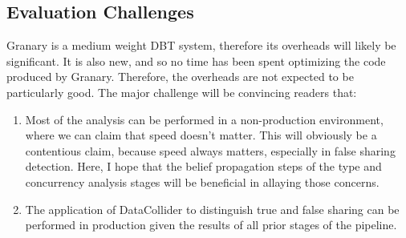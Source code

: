 \documentclass{sig-alternate}
\begin{document}
\subsection{Evaluation Challenges}
Granary is a medium weight DBT system, therefore its overheads will likely be significant. It is also new, and so no time has been
spent optimizing the code produced by Granary. Therefore, the overheads are not expected to be particularly good. The major
challenge will be convincing readers that:
\begin{enumerate}
\item Most of the analysis can be performed in a non-production environment, where we can claim that speed doesn't matter.
This will obviously be a contentious claim, because speed always matters, especially in false sharing detection. Here, I hope
that the belief propagation steps of the type and concurrency analysis stages will be beneficial in allaying those concerns.

\item The application of DataCollider to distinguish true and false sharing can be performed in production given the results of
all prior stages of the pipeline.
\end{enumerate}




\end{document}
